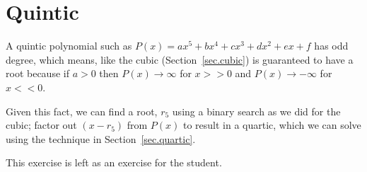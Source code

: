 \section{Quintic}
\label{sec.quintic}

A quintic polynomial such as $P(x) = a x^5 + b x^4 + c x^3 + d x^2 + e x + f$ has odd degree,
which means, like the cubic (Section~\ref{sec.cubic}) is guaranteed to have a root because if
$a>0$ then $P(x)\to \infty$ for $x>>0$ and $P(x)\to -\infty$ for $x<<0$.

Given this fact, we can find a root, $r_5$ using a binary search as we did for the cubic;
factor out $(x-r_5)$ from $P(x)$ to result in a quartic, which we can solve using
the technique in Section~\ref{sec.quartic}.

This exercise is left as an exercise for the student.
